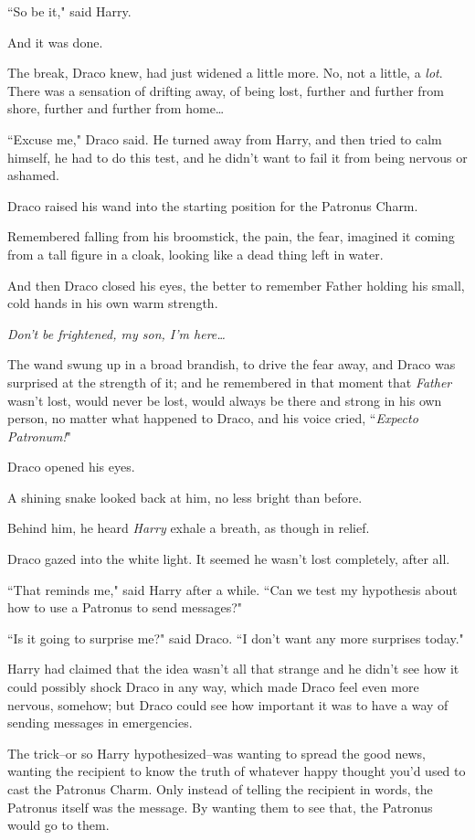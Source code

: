 ``So be it," said Harry.

And it was done.

The break, Draco knew, had just widened a little more. No, not a little, a \emph{lot}. There was a sensation of drifting away, of being lost, further and further from shore, further and further from home{\ldots}

``Excuse me," Draco said. He turned away from Harry, and then tried to calm himself, he had to do this test, and he didn't want to fail it from being nervous or ashamed.

Draco raised his wand into the starting position for the Patronus Charm.

Remembered falling from his broomstick, the pain, the fear, imagined it coming from a tall figure in a cloak, looking like a dead thing left in water.

And then Draco closed his eyes, the better to remember Father holding his small, cold hands in his own warm strength.

\emph{Don't be frightened, my son, I'm here{\ldots}}

The wand swung up in a broad brandish, to drive the fear away, and Draco was surprised at the strength of it; and he remembered in that moment that \emph{Father} wasn't lost, would never be lost, would always be there and strong in his own person, no matter what happened to Draco, and his voice cried, ``\emph{Expecto Patronum!}"

Draco opened his eyes.

A shining snake looked back at him, no less bright than before.

Behind him, he heard \emph{Harry} exhale a breath, as though in relief.

Draco gazed into the white light. It seemed he wasn't lost completely, after all.

``That reminds me," said Harry after a while. ``Can we test my hypothesis about how to use a Patronus to send messages?"

``Is it going to surprise me?" said Draco. ``I don't want any more surprises today."

\later

Harry had claimed that the idea wasn't all that strange and he didn't see how it could possibly shock Draco in any way, which made Draco feel even more nervous, somehow; but Draco could see how important it was to have a way of sending messages in emergencies.

The trick\---or so Harry hypothesized\---was wanting to spread the good news, wanting the recipient to know the truth of whatever happy thought you'd used to cast the Patronus Charm. Only instead of telling the recipient in words, the Patronus itself was the message. By wanting them to see that, the Patronus would go to them.

